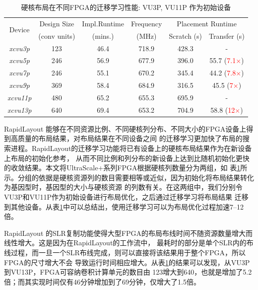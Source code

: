 \begin{table}[h!]
    \caption{硬核布局在不同FPGA的迁移学习性能: VU3P, VU11P 作为初始设备}
    \label{table:port}
    \centering
    \begin{adjustbox}{width=0.8\columnwidth,center}
    \begin{tabular}{c|c c c c c}
      \toprule
  \multirow{2}{*}{Device}     & Design Size 		& Impl.Runtime 		& Frequency 	 & \multicolumn{2}{c}{Placement Runtime}    			\\ \cline{5-6}
                                 & (conv units)		& (mins.)				& (MHz)			 & 	Scratch (s)			& 	Transfer (s)				\\
      \midrule
      \emph{xcvu3p}  			& 123				&	46.4			& 718.9			 & 428.3				& - 							\\
      \emph{xcvu5p}  			& 246				&   56.9				& 677.9	 		 & 396.0				& 55.7 	(\textcolor{red}{7.1$\times$})							\\
      \emph{xcvu7p}  			& 246			    &   55.1				& 670.2	 		 & 345.4				& 44.2 	(\textcolor{red}{7.8$\times$})							\\
      \emph{xcvu9p}  			& 369	   			&   58.4				& 684.9	 		 & 316.5				& 45.5 	(\textcolor{red}{7$\times$})							\\ 
      \midrule
      \emph{xcvu11p} 			& 480	      	    &	65.2          	& 655.3	 		 & 695.9				& -								\\	
      \emph{xcvu13p} 			& 640        	    & 	69.4   			& 653.2	 		 & 704.9				& 58.8	(\textcolor{red}{12$\times$})			\\
      \bottomrule
    \end{tabular}
    \vspace{-0.1in}
    \end{adjustbox}
  \end{table}

RapidLayout 能够在不同资源比例、不同硬核列分布、不同大小的FPGA设备上得到高质量的布局结果，对布局结果在不同设备之间
的迁移学习更加快了布局的搜索进程。RapidLayout的迁移学习功能将已有设备上的硬核布局结果作为在新设备上布局的初始化参考，
从而不同比例和列分布的新设备上达到比随机初始化更快的收敛结果。本文将UltraScale+系列FPGA根据硬核列数量分为两组，如
表\ref{table:port}所示。分组的依据是硬核资源列的数目需要相等或近似，因为初始化将布局结果转化为基因型时，基因型的大小与硬核资源
的列数有关。在这两组中，我们分别令VU3P和VU11P作为初始设备进行布局优化，之后通过迁移学习将布局结果
迁移到其他设备。从表\ref{table:port}中可以总结出，使用迁移学习可以为布局优化过程加速7--12倍。

RapidLayout 的SLR复制功能使得大型FPGA的布局布线时间不随资源数量增大而线性增大。这是因为在RapidLayout的工作流中，
最耗时的部分是单个SLR内的布线过程，而一旦一个SLR布线完成，则可以直接将该结果用于整个FPGA，所以FPGA的尺寸增大不会
导致运行时间相应增大。从表\ref{table:port}的结果可以发现，从VU3P到VU13P，FPGA可容纳卷积计算单元的数目由
123增大到640，也就是增加了5.2倍；而其实现时间仅有46分钟增加到了69分钟，仅增大了1.5倍。


